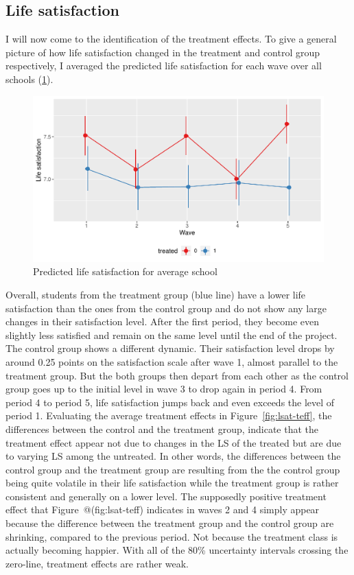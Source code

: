 \documentclass[a4, 12pt]{article}
\begin{document}
\hypertarget{life-satisfaction}{%
\subsection{Life satisfaction}\label{life-satisfaction}}

\label{sec:life-satisfaction}
I will now come to the identification of the treatment effects. To give a general picture of how life satisfaction changed in the treatment and control group respectively, I averaged the predicted life satisfaction for each wave over all schools (\ref{fig:lsat-pred}).

\begin{figure}[H]

{\centering \includegraphics[width=0.8\linewidth,]{../figures/lsat_pred} 

}

\caption{Predicted life satisfaction for average school}\label{fig:lsat-pred}
\end{figure}

Overall, students from the treatment group (blue line) have a lower life satisfaction than the ones from the control group and do not show any large changes in their satisfaction level. After the first period, they become even slightly less satisfied and remain on the same level until the end of the project. The control group shows a different dynamic. Their satisfaction level drops by around 0.25 points on the satisfaction scale after wave 1, almost parallel to the treatment group. But the both groups then depart from each other as the control group goes up to the initial level in wave 3 to drop again in period 4. From period 4 to period 5, life satisfaction jumps back and even exceeds the level of period 1. Evaluating the average treatment effects in Figure~\ref{fig:lsat-teff}, the differences between the control and the treatment group, indicate that the treatment effect appear not due to changes in the LS of the treated but are due to varying LS among the untreated. In other words, the differences between the control group and the treatment group are resulting from the the control group being quite volatile in their life satisfaction while the treatment group is rather consistent and generally on a lower level. The supposedly positive treatment effect that Figure~@(fig:lsat-teff) indicates in waves 2 and 4 simply appear because the difference between the treatment group and the control group are shrinking, compared to the previous period. Not because the treatment class is actually becoming happier. With all of the 80\% uncertainty intervals crossing the zero-line, treatment effects are rather weak.
\end{document}
